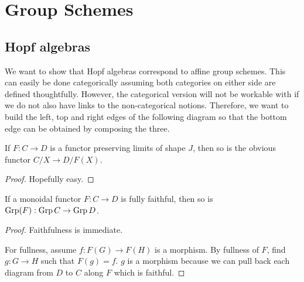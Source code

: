 \section{Group Schemes}


\subsection{Hopf algebras}


We want to show that Hopf algebras correspond to affine group schemes. This can easily be done
categorically assuming both categories on either side are defined thoughtfully. However, the
categorical version will not be workable with if we do not also have links to the non-categorical
notions. Therefore, we want to build the left, top and right edges of the following diagram so that
the bottom edge can be obtained by composing the three.



\begin{proposition}
  \label{0-over-lim}
  \uses{}
  \leanok

  If $F : C \to D$ is a functor preserving limits of shape $J$, then so is the obvious functor $C / X \to D / F(X)$.
\end{proposition}
\begin{proof}
  \uses{}

  Hopefully easy.
\end{proof}


\begin{proposition}
  \label{0-full-faithful-grp}
  \uses{}
  \leanok

  If a monoidal functor $F : C \to D$ is fully faithful, then so is $\operatorname{Grp}(F) : \operatorname{Grp} C \to \operatorname{Grp} D$.
\end{proposition}
\begin{proof}
  \uses{}
  \leanok

  Faithfulness is immediate.

  For fullness, assume $f : F(G) \to F(H)$ is a morphism. By fullness of $F$, find $g : G \to H$ such that $F(g) = f$. $g$ is a morphism because we can pull back each diagram from $D$ to $C$ along $F$ which is faithful.
\end{proof}


